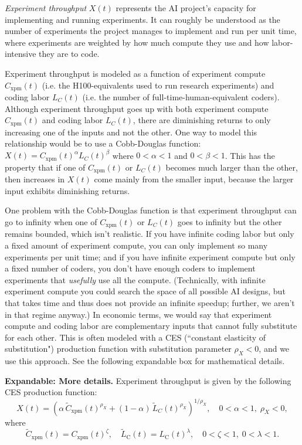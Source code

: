 \documentclass{article}
\theoremstyle{definition}
\begin{document}
\textit{Experiment throughput} $X(t)$ represents the AI project's capacity for implementing and running experiments. It can roughly be understood as the number of experiments the project manages to implement and run per unit time, where experiments are weighted by how much compute they use and how labor-intensive they are to code.

Experiment throughput is modeled as a function of experiment compute $C_\text{xpm}(t)$ (i.e. the H100-equivalents used to run research experiments) and coding labor $L_C(t)$ (i.e. the number of full-time-human-equivalent coders). Although experiment throughput goes up with both experiment compute $C_{\text{xpm}}(t)$ and coding labor $L_C(t)$, there are diminishing returns to only increasing one of the inputs and not the other. One way to model this relationship would be to use a Cobb-Douglas function: $X(t) = C_\text{xpm}(t)^\alpha L_C(t)^\beta$ where $0 < \alpha < 1$ and $0 < \beta < 1$. This has the property that if one of $C_\text{xpm}(t)$ or $L_C(t)$ becomes much larger than the other, then increases in $X(t)$ come mainly from the smaller input, because the larger input exhibits diminishing returns.

One problem with the Cobb-Douglas function is that experiment throughput can go to infinity when one of $C_{\text{xpm}}(t)$ or $L_C(t)$ goes to infinity but the other remains bounded, which isn't realistic. If you have infinite coding labor but only a fixed amount of experiment compute, you can only implement so many experiments per unit time; and if you have infinite experiment compute but only a fixed number of coders, you don't have enough coders to implement experiments that \textit{usefully} use all the compute. (Technically, with infinite experiment compute you could search the space of all possible AI designs, but that takes time and thus does not provide an infinite speedup; further, we aren't in that regime anyway.) In economic terms, we would say that experiment compute and coding labor are complementary inputs that cannot fully substitute for each other. This is often modeled with a CES (``constant elasticity of substitution") production function with substitution parameter $\rho_X < 0$, and we use this approach. See the following expandable box for mathematical details.

\textbf{Expandable: More details.} Experiment throughput is given by the following CES production function:
\[ X(t) = \left( \alpha \, \tilde{C}_{\text{xpm}}(t)^{\rho_X} + (1-\alpha) \, \tilde{L}_C(t)^{\rho_X} \right)^{1/\rho_X}, \quad 0 < \alpha < 1,\; \rho_X < 0,\]
where
\[\tilde C_{\text{xpm}}(t) = C_{\text{xpm}}(t)^\zeta, \quad \tilde L_{\text{C}}(t) = L_{\text{C}}(t)^\lambda, \quad 0 < \zeta < 1,\; 0 < \lambda < 1.\]
\end{document}
